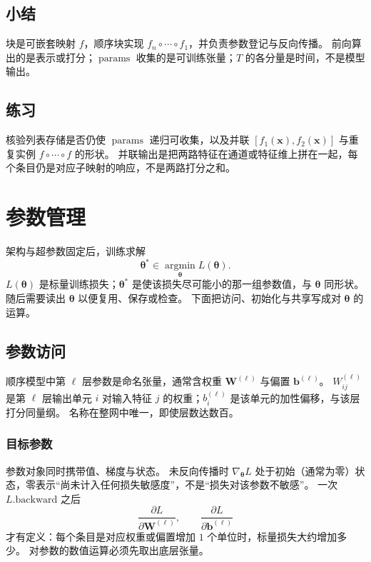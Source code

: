 \subsection{小结}

块是可嵌套映射 $f$，顺序块实现 $f_n\circ\cdots\circ f_1$，并负责参数登记与反向传播。
前向算出的是表示或打分；$\operatorname{params}$ 收集的是可训练张量；$T$ 的各分量是时间，不是模型输出。

\subsection{练习}

核验列表存储是否仍使 $\operatorname{params}$ 递归可收集，以及并联
$[f_1(\bm{x}),f_2(\bm{x})]$ 与重复实例 $f\circ\cdots\circ f$ 的形状。
并联输出是把两路特征在通道或特征维上拼在一起，每个条目仍是对应子映射的响应，不是两路打分之和。

\section{参数管理}

架构与超参数固定后，训练求解
\[
\bm{\theta}^{\ast}\in\operatorname*{argmin}_{\bm{\theta}}L(\bm{\theta}).
\]
$L(\bm{\theta})$ 是标量训练损失；$\bm{\theta}^{\ast}$ 是使该损失尽可能小的那一组参数值，与 $\bm{\theta}$ 同形状。
随后需要读出 $\bm{\theta}$ 以便复用、保存或检查。
下面把访问、初始化与共享写成对 $\bm{\theta}$ 的运算。

\subsection{参数访问}

顺序模型中第 $\ell$ 层参数是命名张量，通常含权重 $\bm{W}^{(\ell)}$ 与偏置 $\bm{b}^{(\ell)}$。
$W^{(\ell)}_{ij}$ 是第 $\ell$ 层输出单元 $i$ 对输入特征 $j$ 的权重；$b^{(\ell)}_i$ 是该单元的加性偏移，与该层打分同量纲。
名称在整网中唯一，即使层数达数百。

\subsubsection{目标参数}

参数对象同时携带值、梯度与状态。
未反向传播时 $\nabla_{\bm{\theta}}L$ 处于初始（通常为零）状态，零表示“尚未计入任何损失敏感度”，不是“损失对该参数不敏感”。
一次 $L.\mathrm{backward}$ 之后
\[
\frac{\partial L}{\partial \bm{W}^{(\ell)}},\qquad
\frac{\partial L}{\partial \bm{b}^{(\ell)}}
\]
才有定义：每个条目是对应权重或偏置增加 $1$ 个单位时，标量损失大约增加多少。
对参数的数值运算必须先取出底层张量。

